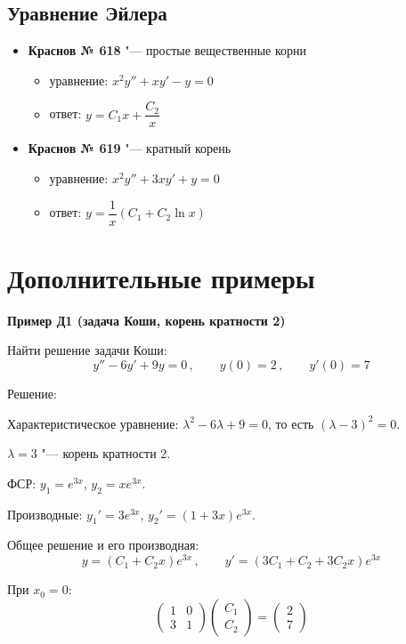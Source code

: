 \documentclass[11pt,a4paper]{article}
\newcommand{\example}[1]{\par\medskip\noindent\textbf{#1}\par\nopagebreak\smallskip}
\begin{document}
\subsection*{Уравнение Эйлера}
\begin{itemize}[topsep=2pt]
  \item \textbf{Краснов № 618} "--- простые вещественные корни
  \begin{itemize}
    \item уравнение: $x^2 y'' + xy' - y = 0$
    \item ответ: $y = C_1 x + \dfrac{C_2}{x}$
  \end{itemize}
  \item \textbf{Краснов № 619} "--- кратный корень
  \begin{itemize}
    \item уравнение: $x^2 y'' + 3xy' + y = 0$
    \item ответ: $y = \dfrac{1}{x}(C_1 + C_2\ln x)$
  \end{itemize}
\end{itemize}

\newpage

\section*{Дополнительные примеры}

\example{Пример Д1 (задача Коши, корень кратности 2)}

Найти решение задачи Коши:
\[
  y'' - 6y' + 9y = 0\,, \qquad y(0) = 2\,, \qquad y'(0) = 7
\]

Решение:

Характеристическое уравнение: $\lambda^2 - 6\lambda + 9 = 0$, то есть $(\lambda - 3)^2 = 0$.

$\lambda = 3$ "--- корень кратности 2.

ФСР: $y_1 = e^{3x}$, $y_2 = x e^{3x}$.

Производные: $y_1' = 3e^{3x}$, $y_2' = (1 + 3x)e^{3x}$.

Общее решение и его производная:
\[
  y = (C_1 + C_2 x)e^{3x}\,, \qquad y' = (3C_1 + C_2 + 3C_2 x)e^{3x}
\]

При $x_0 = 0$:
\[
  \begin{pmatrix} 1 & 0 \\ 3 & 1 \end{pmatrix}
  \begin{pmatrix} C_1 \\ C_2 \end{pmatrix}
  =
  \begin{pmatrix} 2 \\ 7 \end{pmatrix}
\]
\end{document}
